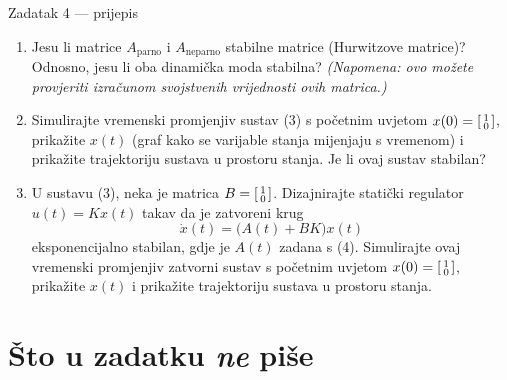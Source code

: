 \begin{zadatak}{Zadatak 4 --- prijepis}
\begin{enumerate}[label=\alph*),leftmargin=*]
  \item Jesu li matrice $A_{\mathrm{parno}}$ i $A_{\mathrm{neparno}}$ stabilne
        matrice (Hurwitzove matrice)? Odnosno, jesu li oba dinamička moda
        stabilna? \emph{(Napomena: ovo možete provjeriti izračunom svojstvenih
        vrijednosti ovih matrica.)}
  \item Simulirajte vremenski promjenjiv sustav (3) s početnim uvjetom
        $x(0) = \begin{bsmallmatrix} 1 \\ 0 \end{bsmallmatrix}$, prikažite $x(t)$
        (graf kako se varijable stanja mijenjaju s vremenom) i prikažite
        trajektoriju sustava u prostoru stanja. Je li ovaj sustav stabilan?
  \item U sustavu (3), neka je matrica
        $B = \begin{bsmallmatrix} 1 \\ 0 \end{bsmallmatrix}$. Dizajnirajte
        statički regulator $u(t) = Kx(t)$ takav da je zatvoreni krug
        \begin{equation}
          \dot{x}(t) = \bigl(A(t) + BK\bigr)x(t) \tag{6}
        \end{equation}
        eksponencijalno stabilan, gdje je $A(t)$ zadana s (4). Simulirajte ovaj
        vremenski promjenjiv zatvorni sustav s početnim uvjetom
        $x(0) = \begin{bsmallmatrix} 1 \\ 0 \end{bsmallmatrix}$, prikažite $x(t)$
        i prikažite trajektoriju sustava u prostoru stanja.
\end{enumerate}
\end{zadatak}

\section{Što u zadatku \emph{ne} piše}
\label{sec:z4-nije-receno}

